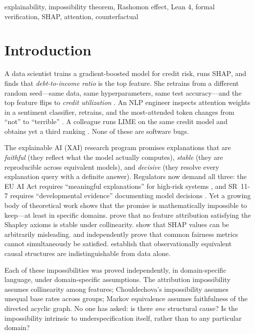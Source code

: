 \documentclass[twoside]{jmlr}
\newcommand{\SHAP}{\textsc{SHAP}}
\begin{document}
\begin{keywords}
explainability, impossibility theorem, Rashomon effect, Lean 4, formal verification, SHAP, attention, counterfactual
\end{keywords}

\section{Introduction}
\label{sec:intro}

A data scientist trains a gradient-boosted model for credit risk, runs \SHAP{},
and finds that \emph{debt-to-income ratio} is the top feature.  She retrains
from a different random seed---same data, same hyperparameters, same test
accuracy---and the top feature flips to \emph{credit utilization}
\citep{krishna2022disagreement}.  An NLP engineer inspects attention weights in
a sentiment classifier, retrains, and the most-attended token changes from
``not'' to ``terrible'' \citep{jainwallace2019}.  A colleague runs LIME on the
same credit model and obtains yet a third ranking
\citep{molnar2022general}.  None of these are software bugs.

The explainable AI (XAI) research program promises explanations that are
\emph{faithful} (they reflect what the model actually computes),
\emph{stable} (they are reproducible across equivalent models), and
\emph{decisive} (they resolve every explanation query with a definite answer).
Regulators now demand all three: the EU AI Act requires ``meaningful
explanations'' for high-risk systems \citep{euaiact2024}, and SR~11-7 requires
``developmental evidence'' documenting model decisions
\citep{occ2011sr117}.  Yet a growing body of theoretical work shows that the
promise is mathematically impossible to keep---at least in specific domains.
\citet{bilodeau2024impossibility} prove that no feature attribution satisfying
the Shapley axioms is stable under collinearity.
\citet{huang2024failings} show that SHAP values can be arbitrarily
misleading.  \citet{chouldechova2017fair} and \citet{kleinberg2017inherent}
independently prove that common fairness metrics cannot simultaneously be
satisfied.  \citet{verma1991equivalence} establish that observationally
equivalent causal structures are indistinguishable from data alone.

Each of these impossibilities was proved independently, in domain-specific
language, under domain-specific assumptions.  The attribution impossibility
assumes collinearity among features; Chouldechova's impossibility assumes
unequal base rates across groups; Markov equivalence assumes faithfulness of
the directed acyclic graph.  No one has asked: is there \emph{one} structural
cause?  Is the impossibility intrinsic to underspecification itself, rather
than to any particular domain?
\end{document}
